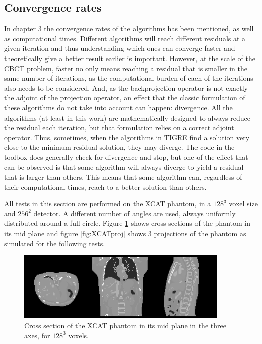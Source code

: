 \subsection{Convergence rates}

In chapter 3 the convergence rates of the algorithms has been mentioned, as well as computational times. Different algorithms will reach different residuals at a given iteration and thus understanding which ones can converge faster and theoretically give a better result earlier is important. However, at the scale of the CBCT problem, faster no only means reaching a residual that is smaller in the same number of iterations, as the computational burden of each of the iterations also needs to be considered. And, as the backprojection operator is not exactly the adjoint of the projection operator, an effect that the classic formulation of these algorithms do not take into account can happen: divergence. All the algorithms (at least in this work) are mathematically designed to always reduce the residual each iteration, but that formulation relies on a correct adjoint operator. Thus, sometimes, when the algorithms in TIGRE find a solution very close to the minimum residual solution, they may diverge. The code in the toolbox does generally check for divergence and stop, but one of the effect that can be observed is that some algorithm will always diverge to yield a residual that is larger than others. This means that some algorithm can, regardless of their computational times, reach to a better solution than others.

All tests in this section are performed on the XCAT phantom\cite{XCAT}, in a $128^3$ voxel size and $256^2$ detector. A different number of angles are used, always uniformly distributed around a full circle. Figure \ref{fig:XCAT} shows cross sections of the phantom in its mid plane and figure \ref{fig:XCATproj} shows 3 projections of the phantom as simulated for the following tests. 

\begin{figure}[h]
\begin{center}

\includegraphics[width=0.9\textwidth]{Applications/XCAT.png} 
\end{center}

\caption[Cross section of the XCAT phantom]{\label{fig:XCAT} Cross section of the XCAT phantom in its mid plane in the three axes, for $128^3$ voxels.} 
\end{figure}

